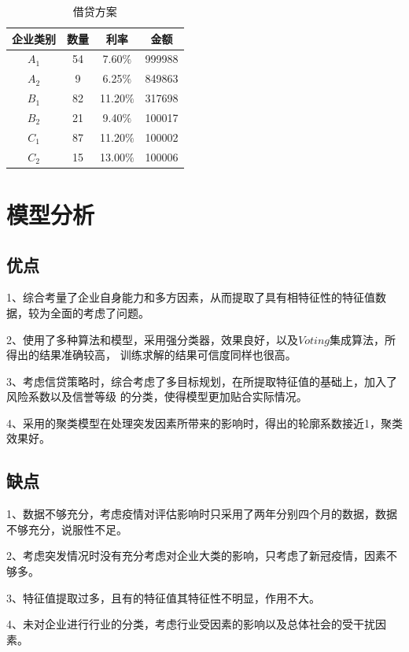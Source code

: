 \documentclass[UTF8]{ctexart}
\begin{document}
\begin{table}[!ht]
	\centering
	\caption{借贷方案}
	\begin{tabular}{||c c c c ||}

		\hline
		企业类别 & 数量 & 利率      & 金额   \\ [0.5ex]
		\hline
		$A_1$    & 54   & 7.60$\%$  & 999988 \\
		\hline
		$A_2$    & 9    & 6.25$\%$  & 849863 \\
		\hline
		$B_1$    & 82   & 11.20$\%$ & 317698 \\
		\hline
		$B_2$    & 21   & 9.40$\%$  & 100017 \\
		\hline
		$C_1$    & 87   & 11.20$\%$ & 100002 \\
		\hline
		$C_2$    & 15   & 13.00$\%$ & 100006 \\
		\hline
	\end{tabular}
\end{table}


\section{模型分析}
\subsection{优点}

1、综合考量了企业自身能力和多方因素，从而提取了具有相特征性的特征值数据，较为全面的考虑了问题。

2、使用了多种算法和模型，采用强分类器，效果良好，以及$Voting$集成算法，所得出的结果准确较高，
训练求解的结果可信度同样也很高。

3、考虑信贷策略时，综合考虑了多目标规划，在所提取特征值的基础上，加入了风险系数以及信誉等级
的分类，使得模型更加贴合实际情况。

4、采用的聚类模型在处理突发因素所带来的影响时，得出的轮廓系数接近1，聚类效果好。

\subsection{缺点}
1、数据不够充分，考虑疫情对评估影响时只采用了两年分别四个月的数据，数据不够充分，说服性不足。

2、考虑突发情况时没有充分考虑对企业大类的影响，只考虑了新冠疫情，因素不够多。

3、特征值提取过多，且有的特征值其特征性不明显，作用不大。

4、未对企业进行行业的分类，考虑行业受因素的影响以及总体社会的受干扰因素。
\end{document}
